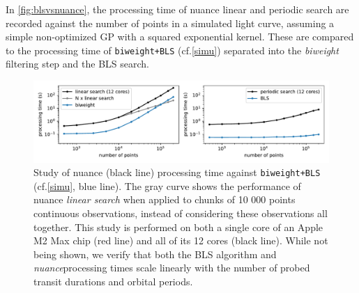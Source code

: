 \documentclass{aastex631}
\newcommand{\nuancemethod}{\textit{nuance}}
\newcommand{\nuancecode}{\textsf{nuance}}
\begin{document}
\noindent In \autoref{fig:blsvsnuance}, the processing time of \nuancecode{} linear and periodic search are recorded against the number of points in a simulated light curve, assuming a simple non-optimized GP with a squared exponential kernel. These are compared to the processing time of \texttt{biweight+BLS} (cf.\;\autoref{simu}) separated into the \textit{biweight} filtering step and the \textsf{BLS} search.
\begin{figure}[H]
    \begin{centering}
        \includegraphics[width=\linewidth]{../workflows/benchmark/figures/nuance_vs_bls.pdf}
        \caption{Study of \textsf{nuance} (black line) processing time against \texttt{biweight+BLS} (cf.\;\autoref{simu}, blue line). The gray curve shows the performance of \textsf{nuance} \textit{linear search} when applied to chunks of 10 000 points continuous observations, instead of considering these observations all together. This study is performed on both a single core of an Apple M2 Max chip (red line) and all of its 12 cores (black line). While not being shown, we verify that both the \textsf{BLS} algorithm and \nuancemethod{}processing times scale linearly with the number of probed transit durations and orbital periods.}
        \label{fig:blsvsnuance}
    \end{centering}
\end{figure}
\end{document}
